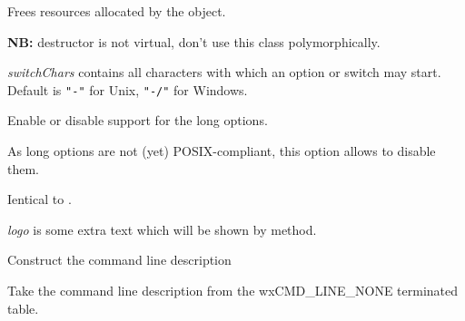 

\label{wxcmdlineparserdtor}


Frees resources allocated by the object.

{\bf NB:} destructor is not virtual, don't use this class polymorphically.

\label{wxcmdlineparsersetswitchchars}


{\it switchChars} contains all characters with which an option or switch may
start. Default is {\tt "-"} for Unix, {\tt "-/"} for Windows.

\label{wxcmdlineparserenablelongoptions}


Enable or disable support for the long options.

As long options are not (yet) POSIX-compliant, this option allows to disable
them.



\label{wxcmdlineparserdisablelongoptions}


Ientical to .

\label{wxcmdlineparsersetlogo}


{\it logo} is some extra text which will be shown by 
 method.

\label{wxcmdlineparsersetdesc}


Construct the command line description

Take the command line description from the wxCMD\_LINE\_NONE terminated table.


